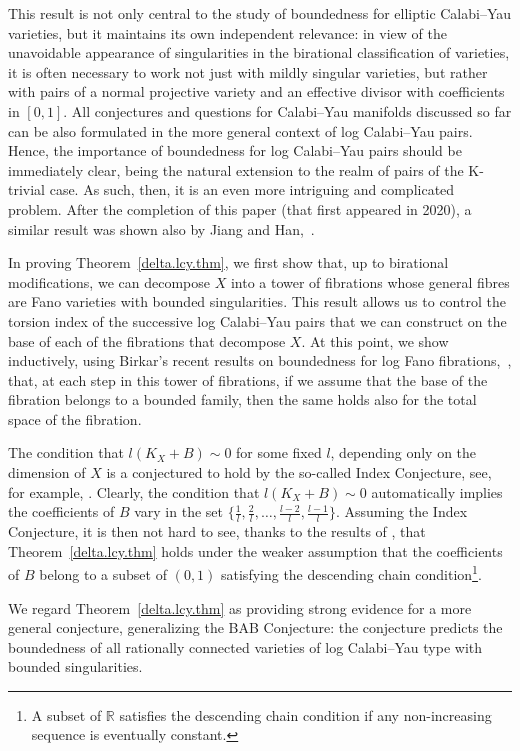 \documentclass[11pt]{ip-journal}
\theoremstyle{definition}
\begin{document}
This result is not only central to the study of boundedness for elliptic Calabi--Yau varieties, but it maintains its own independent relevance: in view of the unavoidable appearance of singularities in the birational classification of varieties, it is often necessary to work not just with mildly singular varieties, but rather with pairs of a normal projective variety and an effective divisor with coefficients in $[0, 1]$.
All conjectures and questions for Calabi--Yau manifolds discussed so far can be also formulated in the more general context of log Calabi--Yau pairs.
Hence, the importance of boundedness for log Calabi--Yau pairs should be immediately clear, being the natural extension to the realm of pairs of the K-trivial case. As such, then, it is an even more intriguing and complicated problem.
After the completion of this paper (that first appeared in 2020), a similar result was shown also by Jiang and Han,~\cite{HJ22}.

In proving Theorem~\ref{delta.lcy.thm}, we first show that, up to birational modifications, we can decompose $X$ into a tower of fibrations whose general fibres are Fano varieties with bounded singularities.
This result allows us to control the torsion index of the successive log Calabi--Yau pairs that we can construct on the base of each of the fibrations that decompose $X$.
At this point, we show inductively, using Birkar's recent results on boundedness for log Fano fibrations,~\cites{1811.10709, 1811.107092}, that, at each step in this tower of fibrations, if we assume that the base of the fibration belongs to a bounded family, then the same holds also for the total space of the fibration.

The condition that 
$l(K_X+B)\sim 0$
for some fixed 
$l$, 
depending only on the dimension of 
$X$ 
is a conjectured to hold by the so-called Index Conjecture, 
see, for example, \cite{Xu.thesis}.
Clearly, the condition that 
$l(K_X+B)\sim 0$
automatically implies the coefficients of 
$B$ 
vary in the set 
$\{\frac 1l, \frac 2l, \dots, \frac{l-2}{l}, \frac{l-1}{l}\}$.
Assuming the Index Conjecture, it is then not hard to see, thanks to the results of 
\cite{MR3224718},
that Theorem~\ref{delta.lcy.thm} holds under the weaker assumption that the coefficients of $B$ belong to a subset of 
$(0, 1)$
satisfying the descending chain condition\footnote{A subset of $\mathbb R$ satisfies the descending chain condition if any non-increasing sequence is eventually constant.}.


We regard Theorem~\ref{delta.lcy.thm} as providing strong evidence for a more general conjecture, generalizing the BAB Conjecture: the conjecture predicts the boundedness of all rationally connected varieties of log Calabi--Yau type with bounded singularities. 
\end{document}
